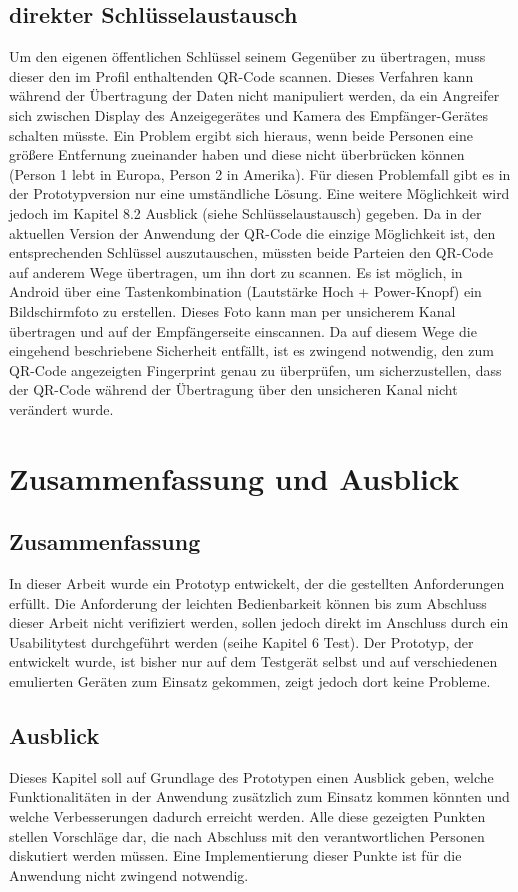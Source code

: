 \documentclass[10pt, a4paper,headsepline,pointednumbers]{scrreprt}
\begin{document}
\section{direkter Schlüsselaustausch}
Um den eigenen öffentlichen Schlüssel seinem Gegenüber zu übertragen, muss dieser den im Profil enthaltenden QR-Code scannen. Dieses Verfahren kann während der Übertragung der Daten nicht manipuliert werden, da ein Angreifer sich zwischen Display des Anzeigegerätes und Kamera des Empfänger-Gerätes schalten müsste. Ein Problem ergibt sich hieraus, wenn beide Personen eine größere Entfernung zueinander haben und diese nicht überbrücken können (Person 1 lebt in Europa, Person 2 in Amerika). Für diesen Problemfall gibt es in der Prototypversion nur eine umständliche Lösung. Eine weitere Möglichkeit wird jedoch im Kapitel 8.2 Ausblick (siehe Schlüsselaustausch) gegeben. Da in der aktuellen Version der Anwendung der QR-Code die einzige Möglichkeit ist, den entsprechenden Schlüssel auszutauschen, müssten beide Parteien den QR-Code auf anderem Wege übertragen, um ihn dort zu scannen. Es ist möglich, in Android über eine Tastenkombination (Lautstärke Hoch + Power-Knopf) ein Bildschirmfoto zu erstellen. Dieses Foto kann man per unsicherem Kanal übertragen und auf der Empfängerseite einscannen. Da auf diesem Wege die eingehend beschriebene Sicherheit entfällt, ist es zwingend notwendig, den zum QR-Code angezeigten Fingerprint genau zu überprüfen, um sicherzustellen, dass der QR-Code während der Übertragung über den unsicheren Kanal nicht verändert wurde.

\chapter{Zusammenfassung und Ausblick}
\section{Zusammenfassung}
In dieser Arbeit wurde ein Prototyp entwickelt, der die gestellten Anforderungen erfüllt. Die Anforderung der leichten Bedienbarkeit können bis zum Abschluss dieser Arbeit nicht verifiziert werden, sollen jedoch direkt im Anschluss durch ein Usabilitytest durchgeführt werden (seihe Kapitel 6 Test). Der Prototyp, der entwickelt wurde, ist bisher nur auf dem Testgerät selbst und auf verschiedenen emulierten Geräten zum Einsatz gekommen, zeigt jedoch dort keine Probleme. 


\section{Ausblick}
Dieses Kapitel soll auf Grundlage des Prototypen einen Ausblick geben, welche Funktionalitäten in der Anwendung zusätzlich zum Einsatz kommen könnten und welche Verbesserungen dadurch erreicht werden. Alle diese gezeigten Punkten stellen Vorschläge dar, die nach Abschluss mit den verantwortlichen Personen diskutiert werden müssen. Eine Implementierung dieser Punkte ist für die Anwendung nicht zwingend notwendig.
\end{document}
